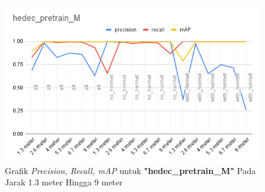 \begin{enumerate}
  \begin{figure} [h!]
    \centering
    \includegraphics[width=1\textwidth]{gambar/BerdasarkanJarak/hedec_pretrain_M.png}
    \caption{Grafik \emph{Precision, Recall, mAP} untuk \textbf{"hedec\_pretrain\_M"} Pada Jarak 1.3 meter Hingga 9 meter}
    \label{fig:grafvaljarak_hedec_pretrain_M}  
  \end{figure}

  \FloatBarrier


\end{enumerate}
